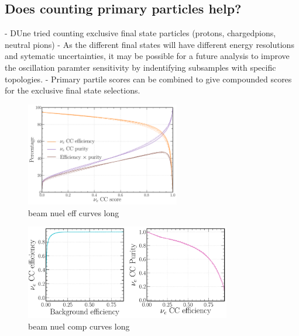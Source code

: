 \subsection{Does counting primary particles help?} %
\label{sec:cvn_beam_prim} %

- DUne tried counting exclusive final state particles (protons, chargedpions, neutral pions)
- As the different final states will have different energy resolutions and sytematic
uncertainties, it may be possible for a future analysis to improve the oscillation paramter
sensitivity by indentifying subsamples with specific topologies.
- Primary partile scores can be combined to give compounded scores for the exclusive final state
selections.

\begin{figure} %
    \includegraphics[width=0.6\textwidth]{diagrams/6-cvn/chipsnet/beam_nuel_eff_curves.pdf}
    \caption[beam nuel eff curves short]
    {beam nuel eff curves long}
    \label{fig:beam_nuel_eff_curves}
\end{figure}

\begin{figure} %
    \includegraphics[width=0.8\textwidth]{diagrams/6-cvn/chipsnet/beam_nuel_comp_curves.pdf}
    \caption[beam nuel comp curves short]
    {beam nuel comp curves long}
    \label{fig:beam_nuel_comp_curves}
\end{figure}

